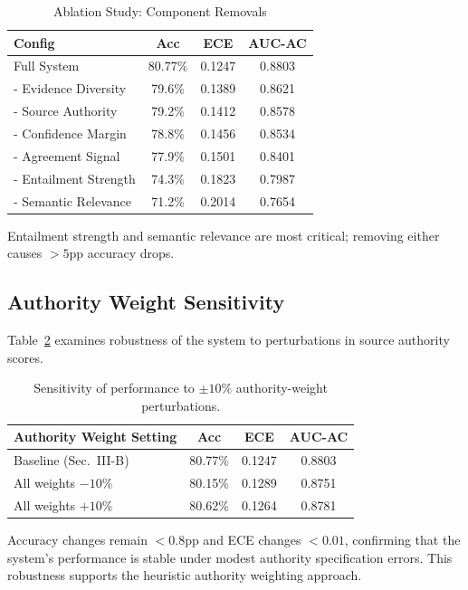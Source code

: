 \documentclass[journal]{IEEEtran}
\begin{document}
\begin{table}[!t]
\centering
\caption{Ablation Study: Component Removals}
\label{tab:ablation}
\begin{tabular}{lccc}
\toprule
\textbf{Config} & \textbf{Acc} & \textbf{ECE} & \textbf{AUC-AC} \\
\midrule
Full System & 80.77\% & 0.1247 & 0.8803 \\
\midrule
- Evidence Diversity & 79.6\% & 0.1389 & 0.8621 \\
- Source Authority & 79.2\% & 0.1412 & 0.8578 \\
- Confidence Margin & 78.8\% & 0.1456 & 0.8534 \\
- Agreement Signal & 77.9\% & 0.1501 & 0.8401 \\
- Entailment Strength & 74.3\% & 0.1823 & 0.7987 \\
- Semantic Relevance & 71.2\% & 0.2014 & 0.7654 \\
\bottomrule
\end{tabular}
\end{table}

Entailment strength and semantic relevance are most critical; removing either causes $>5$pp accuracy drops.

\subsection{Authority Weight Sensitivity}

Table~\ref{tab:auth_sensitivity} examines robustness of the system to perturbations in source authority scores.

\begin{table}[t]
\centering
\caption{Sensitivity of performance to $\pm 10\%$ authority-weight perturbations.}
\label{tab:auth_sensitivity}
\begin{tabular}{lccc}
\toprule
\textbf{Authority Weight Setting} & \textbf{Acc} & \textbf{ECE} & \textbf{AUC-AC} \\
\midrule
Baseline (Sec.~III-B) & 80.77\% & 0.1247 & 0.8803 \\
All weights $-10\%$ & 80.15\% & 0.1289 & 0.8751 \\
All weights $+10\%$ & 80.62\% & 0.1264 & 0.8781 \\
\bottomrule
\end{tabular}
\end{table}

Accuracy changes remain $<0.8$pp and ECE changes $<0.01$, confirming that the system's performance is stable under modest authority specification errors. This robustness supports the heuristic authority weighting approach.
\end{document}
